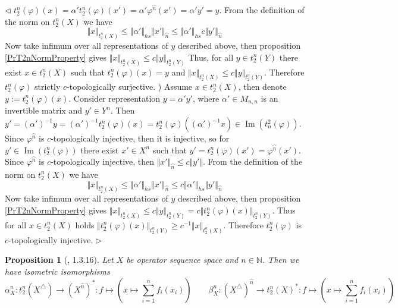 \documentclass[12pt]{article}
\newtheorem{proposition}[theorem]{Proposition}
\newenvironment{proof}{\par $\triangleleft$}{$\triangleright$}
\begin{document}
\begin{proof}
$t_2^n(\varphi)(x)=\alpha't_2^n(\varphi)(x')=\alpha'\varphi^{\wideparen{n}}(x')=\alpha' y'=y$. From the definition of the norm on $t_2^n(X)$ we have
$$
\Vert x\Vert_{t_2^n(X)}
\leq\Vert\alpha'\Vert_{hs}\Vert x'\Vert_{\wideparen{n}}
\leq\Vert\alpha'\Vert_{hs} c\Vert y'\Vert_{\wideparen{n}}
$$
Now take infimum over all representations of $y$ described above, then proposition \ref{PrT2nNormProperty} gives $\Vert x\Vert_{t_2^n(X)}\leq c\Vert y\Vert_{t_2^n(Y)}$
Thus, for all $y\in t_2^n(Y)$ there exist $x\in t_2^n(X)$ such that $t_2^n(\varphi)(x)=y$ and $\Vert x\Vert_{t_2^n(X)}\leq c\Vert y\Vert_{t_2^n(Y)}$. Therefore $t_2^n(\varphi)$ strictly $c$-topologically surjective.
) Assume $x\in t_2^n(X)$, then denote $y:=t_2^n(\varphi)(x)$. Consider representation $y=\alpha' y'$, where $\alpha'\in M_{n,n}$ is an invertible matrix and $y'\in Y^n$. Then 
$y'=(\alpha')^{-1}y=(\alpha')^{-1}t_2^n(\varphi)(x)=t_2^n(\varphi)((\alpha')^{-1}x)\in\operatorname{Im}(t_n^2(\varphi))
$. Since $\varphi^{\wideparen{n}}$ is $c$-topologically injective, then it is injective, so for $y'\in \operatorname{Im}(t_2^n(\varphi))$ there exist $x'\in X^n$ such that 
$y'=t_2^n(\varphi)(x')=\varphi^{\wideparen{n}}(x')$. Since $\varphi^{\wideparen{n}}$ is $c$-topologically injective, then $\Vert x'\Vert_{\wideparen{n}}\leq c\Vert y'\Vert$. From the definition of the norm on $t_2^n(X)$ we have
$$
\Vert x\Vert_{t_2^n(X)}\leq\Vert\alpha'\Vert_{hs}\Vert x'\Vert_{\wideparen{n}}\leq c\Vert\alpha'\Vert_{hs}\Vert y'\Vert_{\wideparen{n}}
$$
Now take infimum over all representations of $y$ described above, then proposition \ref{PrT2nNormProperty} gives $\Vert x\Vert_{t_2^n(X)}\leq c\Vert y\Vert_{t_2^n(Y)}=c\Vert t_2^n(\varphi)(x)\Vert_{t_2^n(Y)}$. 
Thus for all $x\in t_2^n(X)$ holds $\Vert t_2^n(\varphi)(x)\Vert_{t_2^n(Y)}\geq c^{-1}\Vert x\Vert_{t_2^n(X)}$. Therefore $t_2^n(\varphi)$ is $c$-topologically injective.
\end{proof}

\begin{proposition}[\cite{LamOpFolgen}, 1.3.16]\label{PrT2nTraingDuality}
Let $X$ be operator sequence space and $n\in\mathbb{N}$. Then we have isometric isomorphisms
$$
\alpha_X^n:t_2^n(X^\triangle)\to (X^{\wideparen{n}})^*: f\mapsto\left(x\mapsto\sum\limits_{i=1}^n f_i(x_i)\right)
\qquad
\beta_X^n:(X^\triangle)^{\wideparen{n}}\to t_2^n(X)^*:f\mapsto\left(x\mapsto\sum\limits_{i=1}^n f_i(x_i)\right)
$$
\end{proposition}
\end{document}
